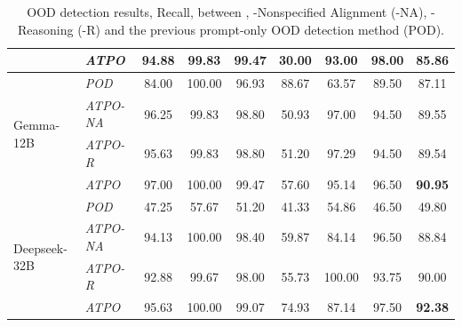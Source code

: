 \begin{table}[t!]
{\begin{tabular}{|l|l|ccccccc|}
                             &  \cellcolor{rowGray} \textit{ATPO}  &  \cellcolor{rowGray} 94.88 & \cellcolor{rowGray} 99.83 &  \cellcolor{rowGray} 99.47 &\cellcolor{rowGray} 30.00 &  \cellcolor{rowGray} 93.00 &  \cellcolor{rowGray} 98.00 &    \multicolumn{1}{|c|}{\cellcolor{rowGray} \textbf{85.86}}   \\  \hline
\multirow{4}{*}{Gemma-12B}   &   \textit{POD}   &   84.00 &    100.00 & 96.93 &   88.67 &  63.57 &   89.50 &    \multicolumn{1}{|c|}{87.11}  \\
                             &  \cellcolor{rowGray} \textit{ATPO-NA}  &  \cellcolor{rowGray} 96.25 &   \cellcolor{rowGray} 99.83 &  \cellcolor{rowGray}  98.80 &   \cellcolor{rowGray}  50.93 &   \cellcolor{rowGray} 97.00 &   \cellcolor{rowGray} 94.50 &     \multicolumn{1}{|c|}{ \cellcolor{rowGray} 89.55}\\ %
                             &  \cellcolor{rowGray} \textit{ATPO-R}  &  \cellcolor{rowGray} 95.63 &   \cellcolor{rowGray} 99.83 &  \cellcolor{rowGray} 98.80 & \cellcolor{rowGray} 51.20 &  \cellcolor{rowGray} 97.29 &   \cellcolor{rowGray} 94.50 &   \multicolumn{1}{|c|}{ \cellcolor{rowGray} 89.54}  \\
                             &  \cellcolor{rowGray} \textit{ATPO}  &  \cellcolor{rowGray} 97.00 &  \cellcolor{rowGray} 100.00 &   \cellcolor{rowGray} 99.47 &  \cellcolor{rowGray} 57.60 &  \cellcolor{rowGray} 95.14 &   \cellcolor{rowGray} 96.50 &  \multicolumn{1}{|c|}{\cellcolor{rowGray} \textbf{90.95}}  \\  \hline
\multirow{4}{*}{Deepseek-32B}   &  \textit{POD}        &   47.25 &  57.67 &  51.20 &  41.33 &   54.86 & 46.50 & \multicolumn{1}{|c|}{49.80}\\
                             &  \cellcolor{rowGray} \textit{ATPO-NA}  &  \cellcolor{rowGray} 94.13 &    \cellcolor{rowGray} 100.00 &  \cellcolor{rowGray} 98.40 &   \cellcolor{rowGray} 59.87 &   \cellcolor{rowGray} 84.14 &  \cellcolor{rowGray} 96.50 &    \multicolumn{1}{|c|}{\cellcolor{rowGray} 88.84} \\ %
                             &  \cellcolor{rowGray} \textit{ATPO-R}  &  \cellcolor{rowGray} 92.88 &  \cellcolor{rowGray} 99.67 &    \cellcolor{rowGray} 98.00 &  \cellcolor{rowGray} 55.73 &  \cellcolor{rowGray} 100.00 &   \cellcolor{rowGray} 93.75 &  \multicolumn{1}{|c|}{\cellcolor{rowGray} 90.00}  \\
                             &  \cellcolor{rowGray} \textit{ATPO}  &  \cellcolor{rowGray} 95.63 &  \cellcolor{rowGray} 100.00 &    \cellcolor{rowGray} 99.07 &  \cellcolor{rowGray} 74.93 &  \cellcolor{rowGray} 87.14 &   \cellcolor{rowGray} 97.50 &  \multicolumn{1}{|c|}{\cellcolor{rowGray} \textbf{92.38}}  \\  \hline
\end{tabular}
}
\caption{OOD detection results, Recall, between \syst, \syst-Nonspecified Alignment (\syst-NA), \syst-Reasoning (\syst-R) and the previous prompt-only OOD detection method (POD). %
}
\label{tab:atpo_results_promptonly}
\end{table}


